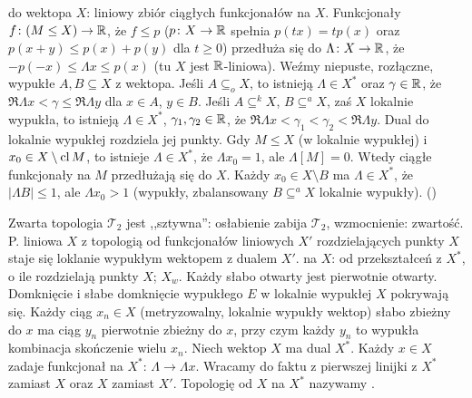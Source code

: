   do wektopa $X$: liniowy zbiór ciągłych funkcjonałów na $X$.
Funkcjonały $f \colon (M \le X) \to \mathbb{R}$, że $f \le p$ ($p \colon X \to \mathbb{R}$ spełnia $p(tx) = tp(x)$ oraz $p(x+y) \le p(x) + p(y)$ dla $t \ge 0$) przedłuża się do $\Lambda \colon X \to \mathbb{R}$, że $-p(-x) \le \Lambda x \le p(x)$ (tu $X$ jest $\mathbb{R}$-liniowa).
Weźmy niepuste, rozłączne, wypukłe $A, B \subseteq X$ z wektopa.
Jeśli $A \subseteq_o X$, to istnieją $\Lambda \in X^*$ oraz $\gamma \in \mathbb{R}$, że $\Re \Lambda x < \gamma \le \Re \Lambda y$ dla $x \in A$, $y \in B$.
Jeśli $A \subseteq^k X$, $B \subseteq^a X$, zaś $X$ lokalnie wypukła, to istnieją $\Lambda \in X^*$, $\gamma_1, \gamma_2 \in \mathbb{R}$, że $\Re \Lambda x < \gamma_1 < \gamma_2 < \Re \Lambda y$.
Dual do lokalnie wypukłej rozdziela jej punkty.
Gdy $M \le X$ (w lokalnie wypukłej) i $x_0 \in X \setminus \operatorname{cl} M$, to istnieje $\Lambda \in X^*$, że $\Lambda x_0 = 1$, ale $\Lambda [M] = 0$.
Wtedy ciągłe funkcjonały na $M$ przedłużają się do $X$.
Każdy $x_0 \in X \setminus B$ ma $\Lambda \in X^*$, że $|\Lambda B | \le 1$, ale $\Lambda x_0 > 1$ (wypukły, zbalansowany $B \subseteq^a X$ lokalnie wypukły).
()

Zwarta  topologia $\mathcal T_2$ jest ,,sztywna'': osłabienie zabija $\mathcal T_2$, wzmocnienie: zwartość.
P. liniowa $X$ z topologią od funkcjonałów liniowych $X'$ rozdzielających punkty $X$ staje się loklanie wypukłym wektopem z dualem $X'$.
 na $X$: od przekształceń z $X^*$, o ile rozdzielają punkty $X$; $X_w$.
Każdy słabo otwarty jest pierwotnie otwarty.
Domknięcie i słabe domknięcie wypukłego $E$ w lokalnie wypukłej $X$ pokrywają się.
Każdy ciąg $x_n \in X$ (metryzowalny, lokalnie wypukły wektop) słabo zbieżny do $x$ ma ciąg $y_n$ pierwotnie zbieżny do $x$, przy czym każdy $y_n$ to wypukła kombinacja skończenie wielu $x_n$.
Niech wektop $X$ ma dual $X^*$.
Każdy $x \in X$ zadaje funkcjonał na $X^*$: $\Lambda \to \Lambda x$.
Wracamy do faktu z pierwszej linijki z $X^*$ zamiast $X$ oraz $X$ zamiast $X'$.
Topologię od $X$ na $X^*$ nazywamy .

